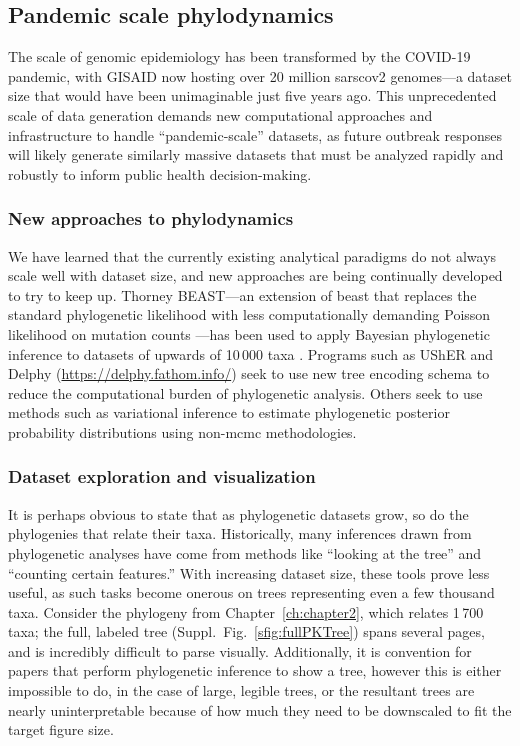 \subsection{Pandemic scale phylodynamics}
The scale of genomic epidemiology has been transformed by the COVID-19 pandemic, with GISAID now hosting over 20 million \gls{sarscov2} genomes---a dataset size that would have been unimaginable just five years ago.
This unprecedented scale of data generation demands new computational approaches and infrastructure to handle ``pandemic-scale'' datasets, as future outbreak responses will likely generate similarly massive datasets that must be analyzed rapidly and robustly to inform public health decision-making.

\subsubsection{New approaches to phylodynamics}
We have learned that the currently existing analytical paradigms do not always scale well with dataset size, and new approaches are being continually developed to try to keep up.
Thorney BEAST---an extension of \gls{beast} that replaces the standard phylogenetic likelihood with less computationally demanding Poisson likelihood on mutation counts \citep{thorne1998estimating}---has been used to apply Bayesian phylogenetic inference to datasets of upwards of 10\,000 taxa \citep{du2021establishment}.
Programs such as UShER \citep{turakhia2021ultrafast} and Delphy (\url{https://delphy.fathom.info/}) seek to use new tree encoding schema to reduce the computational burden of phylogenetic analysis.
Others seek to use methods such as variational inference \citep{zhang2019variational} to estimate phylogenetic posterior probability distributions using non-\gls{mcmc} methodologies.

\subsubsection{Dataset exploration and visualization}
It is perhaps obvious to state that as phylogenetic datasets grow, so do the phylogenies that relate their taxa.
Historically, many inferences drawn from phylogenetic analyses have come from methods like ``looking at the tree'' and ``counting certain features.''
With increasing dataset size, these tools prove less useful, as such tasks become onerous on trees representing even a few thousand taxa.
Consider the phylogeny from Chapter~\ref{ch:chapter2}, which relates 1\,700 taxa; the full, labeled tree (Suppl.~Fig.~\ref{sfig:fullPKTree}) spans several pages, and is incredibly difficult to parse visually.
Additionally, it is convention for papers that perform phylogenetic inference to show a tree, however this is either impossible to do, in the case of large, legible trees, or the resultant trees are nearly uninterpretable because of how much they need to be downscaled to fit the target figure size.

